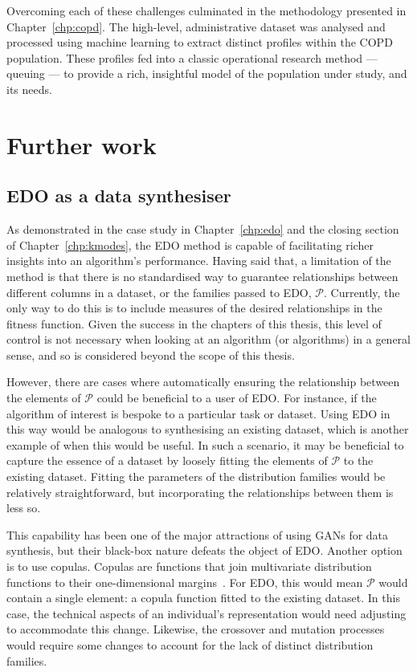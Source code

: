 Overcoming each of these challenges culminated in the methodology presented in
Chapter~\ref{chp:copd}. The high-level, administrative dataset was analysed and
processed using machine learning to extract distinct profiles within the COPD
population. These profiles fed into a classic operational research method ---
queuing --- to provide a rich, insightful model of the population under study,
and its needs.


\section{Further work}\label{sec:further}

\subsection*{EDO as a data synthesiser}

As demonstrated in the case study in Chapter~\ref{chp:edo} and the closing
section of Chapter~\ref{chp:kmodes}, the EDO method is capable of facilitating
richer insights into an algorithm's performance. Having said that, a limitation
of the method is that there is no standardised way to guarantee relationships
between different columns in a dataset, or the families passed to EDO,
\(\mathcal P\). Currently, the only way to do this is to include measures of the
desired relationships in the fitness function. Given the success in the chapters
of this thesis, this level of control is not necessary when looking at an
algorithm (or algorithms) in a general sense, and so is considered beyond the
scope of this thesis.

However, there are cases where automatically ensuring the relationship between
the elements of \(\mathcal P\) could be beneficial to a user of EDO. For
instance, if the algorithm of interest is bespoke to a particular task or
dataset. Using EDO in this way would be analogous to synthesising an existing
dataset, which is another example of when this would be useful. In such a
scenario, it may be beneficial to capture the essence of a dataset by loosely
fitting the elements of \(\mathcal P\) to the existing dataset. Fitting the
parameters of the distribution families would be relatively straightforward, but
incorporating the relationships between them is less so.

This capability has been one of the major attractions of using GANs for data
synthesis, but their black-box nature defeats the object of EDO. Another option
is to use copulas. Copulas are functions that join multivariate distribution
functions to their one-dimensional margins~\cite{Nelsen1999}. For EDO, this
would mean \(\mathcal P\) would contain a single element: a copula function
fitted to the existing dataset. In this case, the technical aspects of an
individual's representation would need adjusting to accommodate this change.
Likewise, the crossover and mutation processes would require some changes to
account for the lack of distinct distribution families.

